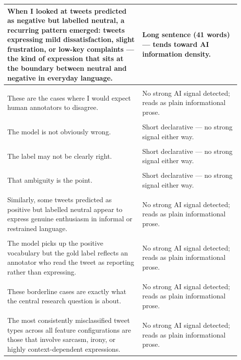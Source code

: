 \documentclass[11pt]{article}
\begin{document}
\begin{longtable}{|p{0.55\linewidth}|p{0.40\linewidth}|}
\hline
When I looked at tweets predicted as negative but labelled neutral, a recurring pattern emerged: tweets expressing mild dissatisfaction, slight frustration, or low-key complaints --- the kind of expression that sits at the boundary between neutral and negative in everyday language. & Long sentence (41 words) --- tends toward AI information density. \\[2pt]
\hline
\rule{0pt}{3.5cm} & \\
\hline
These are the cases where I would expect human annotators to disagree. & No strong AI signal detected; reads as plain informational prose. \\[2pt]
\hline
\rule{0pt}{3.5cm} & \\
\hline
The model is not obviously wrong. & Short declarative --- no strong signal either way. \\[2pt]
\hline
\rule{0pt}{3.5cm} & \\
\hline
The label may not be clearly right. & Short declarative --- no strong signal either way. \\[2pt]
\hline
\rule{0pt}{3.5cm} & \\
\hline
That ambiguity is the point. & Short declarative --- no strong signal either way. \\[2pt]
\hline
\rule{0pt}{3.5cm} & \\
\hline
Similarly, some tweets predicted as positive but labelled neutral appear to express genuine enthusiasm in informal or restrained language. & No strong AI signal detected; reads as plain informational prose. \\[2pt]
\hline
\rule{0pt}{3.5cm} & \\
\hline
The model picks up the positive vocabulary but the gold label reflects an annotator who read the tweet as reporting rather than expressing. & No strong AI signal detected; reads as plain informational prose. \\[2pt]
\hline
\rule{0pt}{3.5cm} & \\
\hline
These borderline cases are exactly what the central research question is about. & No strong AI signal detected; reads as plain informational prose. \\[2pt]
\hline
\rule{0pt}{3.5cm} & \\
\hline
The most consistently misclassified tweet types across all feature configurations are those that involve sarcasm, irony, or highly context-dependent expressions. & No strong AI signal detected; reads as plain informational prose. \\[2pt]
\hline

\end{longtable}
\end{document}
